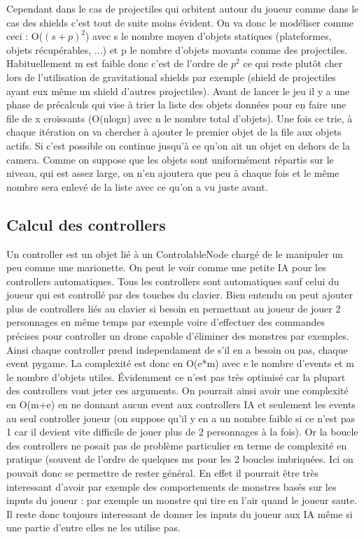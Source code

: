 \documentclass[11pt]{article}
\begin{document}
 Cependant dans le cas de projectiles qui orbitent autour du joueur comme dans le cas des shields c'est tout de suite moins évident. On va donc le modéliser comme ceci : O($(s+p)^2$) avec s le nombre moyen d'objets statiques (plateformes, objets récupérables, ...) et p le nombre d'objets movants comme des projectiles. Habituellement m est faible donc c'est de l'ordre de $p^2$ ce qui reste plutôt cher lors de l'utilisation de gravitational shields par exemple (shield de projectiles ayant eux même un shield d'autres projectiles). Avant de lancer le jeu il y a une phase de précalculs qui vise à trier la liste des objets données pour en faire une file de x croissants (O(nlogn) avec n le nombre total d'objets). Une fois ce trie, à chaque itération on va chercher à ajouter le premier objet de la file aux objets actifs. Si c'est possible on continue jusqu'à ce qu'on ait un objet en dehors de la camera. Comme on suppose que les objets sont uniformément répartis sur le niveau, qui est assez large, on n'en ajoutera que peu à chaque fois et le même nombre sera enlevé de la liste avec ce qu'on a vu juste avant.


\subsection{Calcul des controllers}
Un controller est un objet lié à un ControlableNode chargé de le manipuler un peu comme une marionette. On peut le voir comme une petite IA pour les controllers automatiques. Tous les controllers sont automatiques sauf celui du joueur qui est controllé par des touches du clavier. Bien entendu on peut ajouter plus de controllers liés au clavier si besoin en permettant au joueur de jouer 2 personnages en même temps par exemple voire d'effectuer des commandes précises pour controller un drone capable d'éliminer des monstres par exemples. Ainsi chaque controller prend independament de s'il en a besoin ou pas, chaque event pygame. La complexité est donc en O(e*m) avec e le nombre d'events et m le nombre d'objets utiles. Évidemment ce n'est pas très optimisé car la plupart des controllers vont jeter ces arguments. On pourrait ainsi avoir une complexité en O(m+e) en ne donnant aucun event aux controllers IA et seulement les events au seul controller joueur (on suppose qu'il y en a un nombre faible si ce n'est pas 1 car il devient vite difficile de jouer plus de 2 personnages à la fois). Or la boucle des controllers ne posait pas de problème particulier en terme de complexité en pratique (souvent de l'ordre de quelques ms pour les 2 boucles imbriquées. Ici on pouvait donc se permettre de rester général. En effet il pourrait être très interessant d'avoir par exemple des comportements de monstres basés sur les inputs du joueur : par exemple un monstre qui tire en l'air quand le joueur saute. Il reste donc toujours interessant de donner les inputs du joueur aux IA même si une partie d'entre elles ne les utilise pas.
\end{document}
